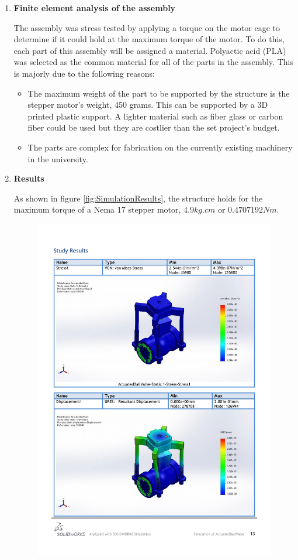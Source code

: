 \begin{enumerate}
\begin{enumerate}
    \item \textbf{Finite element analysis of the assembly}
    \par
    The assembly was stress tested by applying a torque on the motor cage to determine if it could hold at the maximum torque of the motor. To do this, each part of this assembly will be assigned a material. Polyactic acid (PLA) was selected as the common material for all of the parts in the assembly. This is majorly due to the following reasons:
    \begin{itemize}
        \item The maximum weight of the part to be supported by the structure is the stepper motor's weight, 450 grams. This can be supported by a 3D printed plastic support. A lighter material such as fiber glass or carbon fiber could be used but they are costlier than the set project's budget.
        \item The parts are complex for fabrication on the currently existing machinery in the university.
    \end{itemize}
    \par
    \item \textbf{Results}
    \par
    As shown in figure \ref{fig:SimulationResults}, the structure holds for the maximum torque of a Nema 17 stepper motor, $4.9 kg.cm$ or $0.4707192 Nm$.
    \begin{figure}[H]
        \centering
        \includegraphics[width=\textwidth]{Figures/ActuatedBallValve-Static-1-1-1.png}

\end{figure}
\end{enumerate}
\end{enumerate}
